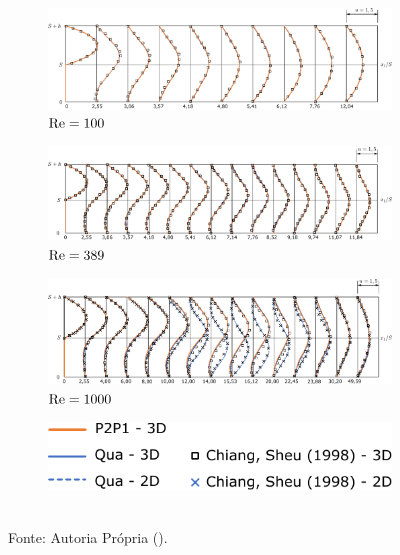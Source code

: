 \begin{figure}[h!]
    \centering
    \caption{Escoamento em degrau invertido - Perfis de velocidade.}
    \begin{subfigure}{0.9\textwidth}
        \includegraphics[width=\linewidth]{Figuras/backwardFacingStep/Re100.pdf}
        \caption{$\mathrm{Re}=100$}
    \end{subfigure}
    \begin{subfigure}{0.9\textwidth}
        \includegraphics[width=\linewidth]{Figuras/backwardFacingStep/Re389.pdf}
        \caption{$\mathrm{Re}=389$}
    \end{subfigure}
    \begin{subfigure}{0.9\textwidth}
        \includegraphics[width=\linewidth]{Figuras/backwardFacingStep/Re1000.pdf}
        \caption{$\mathrm{Re}=1000$}
    \end{subfigure}
    \begin{subfigure}{0.3\textwidth}
        \includegraphics[width=\linewidth]{Figuras/backwardFacingStep/legenda.pdf}
    \end{subfigure}
    \\Fonte: Autoria Própria (\the\year).
    \label{fig:BFSvel}
\end{figure}

